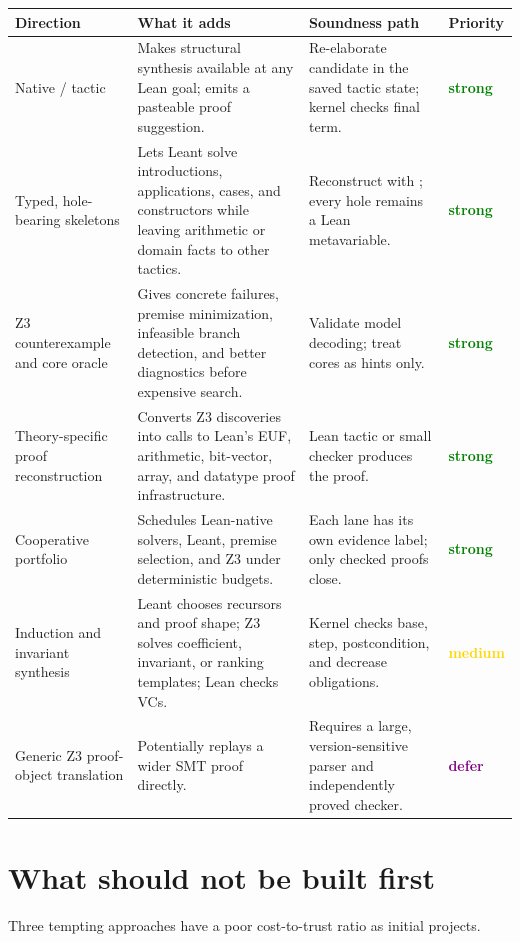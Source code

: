 \documentclass[11pt,letterpaper,openany]{report}
\newcommand{\code}[1]{\texttt{\detokenize{#1}}}
\newcommand{\priohigh}{\textcolor{Green}{\textbf{strong}}}
\newcommand{\priomed}{\textcolor{Gold}{\textbf{medium}}}
\newcommand{\priodefer}{\textcolor{Purple}{\textbf{defer}}}
\begin{document}
\begin{longtable}{@{}L{0.19\textwidth}L{0.29\textwidth}L{0.25\textwidth}L{0.17\textwidth}@{}}
\toprule
\textbf{Direction} & \textbf{What it adds} & \textbf{Soundness path} & \textbf{Priority} \\
\midrule
\endhead
Native \code{leant?}/\code{leant} tactic & Makes structural synthesis available at any Lean goal; emits a pasteable proof suggestion. & Re-elaborate candidate in the saved tactic state; kernel checks final term. & \priohigh \\
Typed, hole-bearing skeletons & Lets Leant solve introductions, applications, cases, and constructors while leaving arithmetic or domain facts to other tactics. & Reconstruct with \code{refine}; every hole remains a Lean metavariable. & \priohigh \\
Z3 counterexample and core oracle & Gives concrete failures, premise minimization, infeasible branch detection, and better diagnostics before expensive search. & Validate model decoding; treat cores as hints only. & \priohigh \\
Theory-specific proof reconstruction & Converts Z3 discoveries into calls to Lean's EUF, arithmetic, bit-vector, array, and datatype proof infrastructure. & Lean tactic or small checker produces the proof. & \priohigh \\
Cooperative \code{solve?} portfolio & Schedules Lean-native solvers, Leant, premise selection, and Z3 under deterministic budgets. & Each lane has its own evidence label; only checked proofs close. & \priohigh \\
Induction and invariant synthesis & Leant chooses recursors and proof shape; Z3 solves coefficient, invariant, or ranking templates; Lean checks VCs. & Kernel checks base, step, postcondition, and decrease obligations. & \priomed \\
Generic Z3 proof-object translation & Potentially replays a wider SMT proof directly. & Requires a large, version-sensitive parser and independently proved checker. & \priodefer \\
\bottomrule
\end{longtable}

\section{What should not be built first}

Three tempting approaches have a poor cost-to-trust ratio as initial projects.
\end{document}
